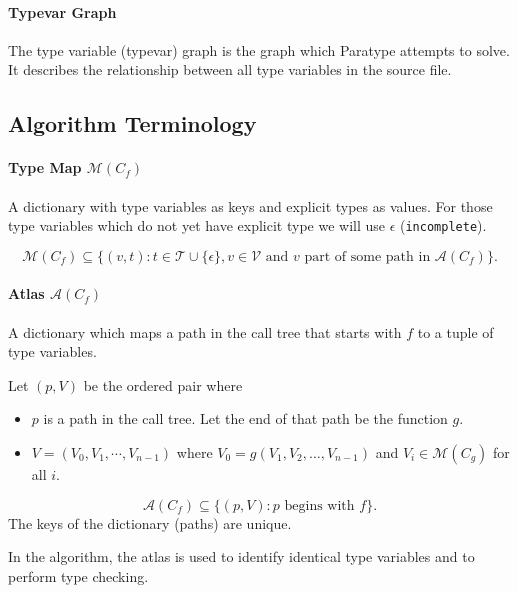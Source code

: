 \documentclass[10pt]{article}
\begin{document}
	\paragraph{Typevar Graph}
	The type variable (typevar) graph is the graph which Paratype attempts to
	solve. It describes the relationship between all type variables in the
	source file.
	
\subsection{Algorithm Terminology}
	\paragraph{Type Map $\mathcal{M}(C_f)$}
	A dictionary with type variables as keys and explicit types as values. For
	those type variables which do not yet have explicit type we will use
	$\epsilon$ (\texttt{incomplete}).
	
	\[
	\mathcal{M}(C_f) \subseteq \{ (v, t) : t \in \mathcal{T}
	\cup \{\epsilon\}, v \in \mathcal{V}\textrm{ and $v$ part of some path in
	}\mathcal{A}(C_f) \}.
	\]
	 
	\paragraph{Atlas $\mathcal{A}(C_f)$}
	A dictionary which maps a path in the call tree that starts with $f$ to a
	tuple of type variables.
	
	Let $(p, V)$ be the ordered pair where
	\begin{itemize}[noitemsep]
		\item $p$ is a path in the call tree. Let the end of that path be the
			function $g$.
		\item $V = (V_0, V_1, \cdots, V_{n-1})$ where $V_0 = g(V_{1}, V_{2},
			\ldots, V_{n-1})$ and $V_{i} \in \mathcal{M}(C_g)$ for all $i$.
	\end{itemize}
	\[
		\mathcal{A}(C_f) \subseteq \{ (p , V) : p\textrm{ begins with }f\}.
	\]
	The keys of the dictionary (paths) are unique.

	In the algorithm, the atlas is used to
	identify identical type variables and to perform type checking.
\end{document}
